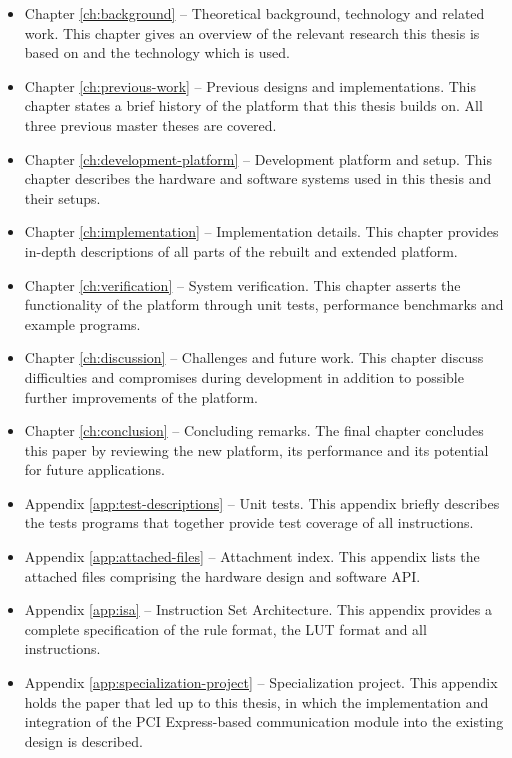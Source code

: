 \begin{itemize}
    \item Chapter \ref{ch:background} –
        Theoretical background, technology and related work.
        This chapter gives an overview of the relevant research this thesis is based on and the technology which is used.
    \item Chapter \ref{ch:previous-work} –
        Previous designs and implementations.
        This chapter states a brief history of the platform that this thesis builds on.
        All three previous master theses are covered.
    \item Chapter \ref{ch:development-platform} –
        Development platform and setup.
        This chapter describes the hardware and software systems used in this thesis and their setups.
    \item Chapter \ref{ch:implementation} –
        Implementation details.
        This chapter provides in-depth descriptions of all parts of the rebuilt and extended platform.
    \item Chapter \ref{ch:verification} –
        System verification.
        This chapter asserts the functionality of the platform through unit tests, performance benchmarks and example programs.
    \item Chapter \ref{ch:discussion} –
        Challenges and future work.
        This chapter discuss difficulties and compromises during development in addition to possible further improvements of the platform.
    \item Chapter \ref{ch:conclusion} –
        Concluding remarks.
        The final chapter concludes this paper by reviewing the new platform, its performance and its potential for future applications.
    \item Appendix \ref{app:test-descriptions} –
        Unit tests.
        This appendix briefly describes the tests programs that together provide test coverage of all instructions.
    \item Appendix \ref{app:attached-files} –
        Attachment index.
        This appendix lists the attached files comprising the hardware design and software API.
    \item Appendix \ref{app:isa} –
        Instruction Set Architecture.
        This appendix provides a complete specification of the rule format, the LUT format and all instructions.
    \item Appendix \ref{app:specialization-project} –
        Specialization project.
        This appendix holds the paper that led up to this thesis, in which the implementation and integration of the PCI Express-based communication module into the existing design is described.
\end{itemize}
